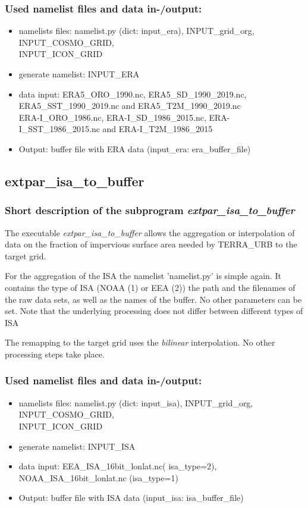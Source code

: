 \documentclass[a4paper,10pt,DIV14,BCOR1cm,titlepage,twoside]{scrartcl}
\begin{document}
\subsubsection{Used namelist files and data in-/output:}
\begin{itemize}
 \item namelists files: namelist.py (dict: input\_era), INPUT\_grid\_org, INPUT\_COSMO\_GRID, \\
       INPUT\_ICON\_GRID
 \item generate namelist: INPUT\_ERA
 \item data input: ERA5\_ORO\_1990.nc, ERA5\_SD\_1990\_2019.nc, ERA5\_SST\_1990\_2019.nc and ERA5\_T2M\_1990\_2019.nc \\
       ERA-I\_ORO\_1986.nc, ERA-I\_SD\_1986\_2015.nc, ERA-I\_SST\_1986\_2015.nc and ERA-I\_T2M\_1986\_2015
 \item Output: buffer file with ERA data (input\_era: era\_buffer\_file)
\end{itemize}

\subsection{extpar\_isa\_to\_buffer}\label{extpar_isa_to_buffer}
\subsubsection{Short description of the subprogram \textit{extpar\_isa\_to\_buffer}}
The executable \textit{extpar\_isa\_to\_buffer} allows the aggregation or interpolation of data on the fraction of impervious surface area needed by TERRA\_URB to the target grid. \par\medskip\noindent
For the aggregation of the ISA the namelist 'namelist.py' is simple again. It contains the type of ISA (NOAA (1) or EEA (2)) the path and the filenames of the raw data sets, as well as the names of the buffer. No other parameters can be set. Note that the underlying processing does not differ between different types of ISA \par\medskip\noindent

The remapping to the target grid uses the \textit{bilinear} interpolation. No other processing steps take place. 

\subsubsection{Used namelist files and data in-/output:}
\begin{itemize}
 \item namelists files: namelist.py (dict: input\_isa), INPUT\_grid\_org, INPUT\_COSMO\_GRID, \\
       INPUT\_ICON\_GRID
 \item generate namelist: INPUT\_ISA
 \item data input: EEA\_ISA\_16bit\_lonlat.nc( isa\_type=2), NOAA\_ISA\_16bit\_lonlat.nc (isa\_type=1)
 \item Output: buffer file with ISA data (input\_isa: isa\_buffer\_file)
\end{itemize}
\end{document}
